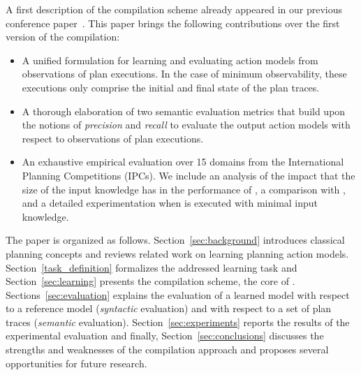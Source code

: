 A first description of the \FAMA compilation scheme already appeared in our previous conference paper~\cite{aineto2018learning}. This paper brings the following contributions over the first version of the compilation:

\begin{itemize}
\item A unified formulation for learning and evaluating action models from observations of plan executions. In the case of minimum observability, these executions only comprise the initial and final state of the plan traces.
\item A thorough elaboration of two semantic evaluation metrics that build upon the notions of {\em precision} and {\em recall} to evaluate the output action models with respect to observations of plan executions.
\item An exhaustive empirical evaluation over 15 domains from the International Planning Competitions (IPCs). We include an analysis of the impact that the size of the input knowledge has in the performance of \FAMA, a comparison with \ARMS, and a detailed experimentation when \FAMA is executed with minimal input knowledge.
\end{itemize}


The paper is organized as follows. Section~\ref{sec:background} introduces classical planning concepts and reviews related work on learning planning action models. Section~\ref{task_definition} formalizes the addressed learning task and Section~\ref{sec:learning} presents the compilation scheme, the core of \FAMA. Sections~\ref{sec:evaluation} explains the evaluation of a learned model with respect to a reference model ({\em syntactic} evaluation) and with respect to a set of plan traces ({\em semantic} evaluation). Section~\ref{sec:experiments} reports the results of the experimental evaluation and finally, Section~\ref{sec:conclusions} discusses the strengths and weaknesses of the compilation approach and proposes several opportunities for future research.








